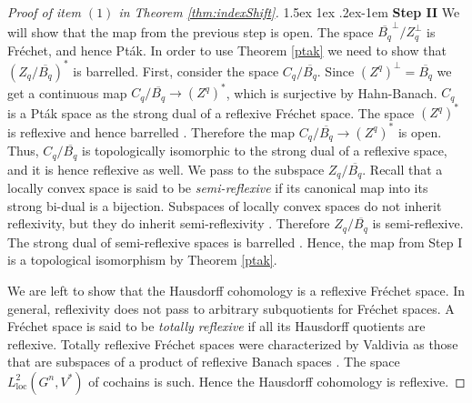 \documentclass[12pt,reqno]{amsart}
\makeatletter
\theoremstyle{definition}
\renewcommand\paragraph{\@startsection{paragraph}{4}{\z@}%
  {1.5ex \@plus 1ex \@minus .2ex}{-1em}%
  {\normalfont\normalsize\bfseries}}
\makeatother
\begin{document}
\begin{proof}[Proof of item $(1)$ in Theorem \ref{thm:indexShift}]
\paragraph{\textbf{Step II}} We will show that the map from the previous step is open. The space $\overline{B_q}^\perp / Z_q^\perp$ is Fr\'echet, and hence Pt\'ak. In order to use Theorem \ref{ptak} we need to show that $(Z_q / \overline{B_q})^*$ is barrelled. First, consider the space $C_q / \overline{B_q}$. Since $(Z^q)^{\perp}=\overline{B_q}$ we get a continuous map $C_q / \overline{B_q} \to (Z^q)^*$, which is surjective by Hahn-Banach. $C_q$ is a Pt\'ak space as the strong dual of a reflexive Fr\'echet space. The space $(Z^q)^*$ is reflexive and hence barrelled \cite[Theorem~20.7]{KelleyNamioka}. Therefore the map $C_q / \overline{B_q} \to (Z^q)^*$ is open. Thus, $C_q / \overline{B_q}$ is topologically isomorphic to the strong dual of a reflexive space, and it is hence reflexive as well. We pass to the subspace $Z_q/ \overline{B_q}$. Recall that a locally convex space is said to be \emph{semi-reflexive} if its canonical map into its strong bi-dual is a bijection. Subspaces of locally convex spaces do not inherit reflexivity, but they do inherit semi-reflexivity \cite[Theorem~20.2]{KelleyNamioka}. Therefore $Z_q/ \overline{B_q}$ is semi-reflexive. The strong dual of semi-reflexive spaces is barrelled \cite[Theorem~IV.5.5]{SchaeferWolff}. Hence, the map from Step I is a topological isomorphism by Theorem \ref{ptak}.

We are left to show that the Hausdorff cohomology is a reflexive Fr\'echet space. In general, reflexivity does not pass to arbitrary subquotients for Fr\'echet spaces. A Fr\'echet space is said to be \emph{totally reflexive} if all its Hausdorff quotients are reflexive. Totally reflexive Fr\'echet spaces were characterized by Valdivia as those that are subspaces of a product of reflexive Banach spaces \cite[Theorem~3]{valdivia}. The space $L^2_{\mathrm{loc}}(G^n,V^*)$ of cochains is such. Hence the Hausdorff cohomology is reflexive.
\end{proof}
\end{document}

